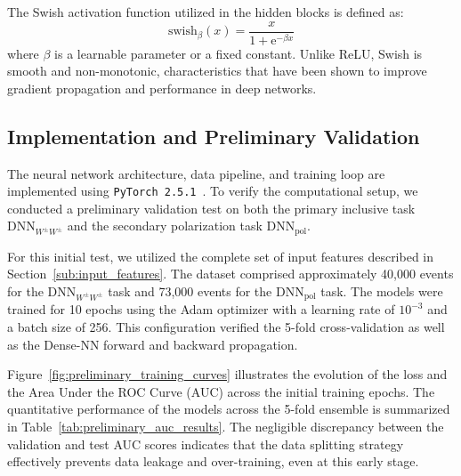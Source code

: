 \documentclass[12pt]{article}
\newcommand*{\euler}{\mathrm{e}}
\begin{document}
        The Swish activation function utilized in the hidden blocks is defined as:
        \begin{equation}
            \mathrm{swish}_{\beta}(x) = \frac{x}{1 + \euler^{-\beta x}}
        \end{equation}
        where $\beta$ is a learnable parameter or a fixed constant. Unlike ReLU, Swish is smooth and non-monotonic, characteristics that have been shown to improve gradient propagation and performance in deep networks.
        

    \subsection{Implementation and Preliminary Validation}%
    \label{sub:implementation_and_preliminary_validation}

        The neural network architecture, data pipeline, and training loop are implemented using \verb|PyTorch 2.5.1|~\cite{10.1145/3620665.3640366}. To verify the computational setup, we conducted a preliminary validation test on both the primary inclusive task $\text{DNN}_{W^{\pm}W^{\pm}}$ and the secondary polarization task $\text{DNN}_{\text{pol}}$.

        For this initial test, we utilized the complete set of input features described in Section~\ref{sub:input_features}. The dataset comprised approximately 40,000 events for the $\text{DNN}_{W^{\pm}W^{\pm}}$ task and 73,000 events for the $\text{DNN}_{\text{pol}}$ task. The models were trained for 10 epochs using the Adam optimizer with a learning rate of $10^{-3}$ and a batch size of 256. This configuration verified the 5-fold cross-validation as well as the Dense-NN forward and backward propagation.

        Figure~\ref{fig:preliminary_training_curves} illustrates the evolution of the loss and the Area Under the ROC Curve (AUC) across the initial training epochs. The quantitative performance of the models across the 5-fold ensemble is summarized in Table~\ref{tab:preliminary_auc_results}. The negligible discrepancy between the validation and test AUC scores indicates that the data splitting strategy effectively prevents data leakage and over-training, even at this early stage. 
\end{document}
